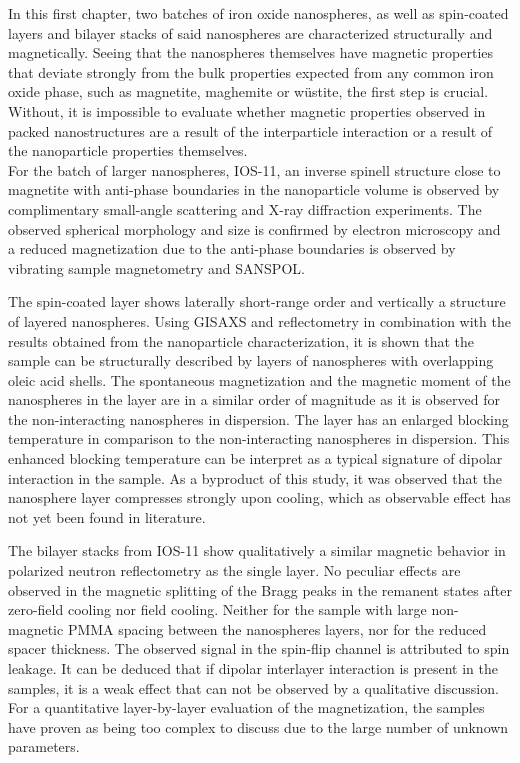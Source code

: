 \documentclass[\main/dresen_thesis.tex]{subfiles}
\begin{document}
  In this first chapter, two batches of iron oxide nanospheres, as well as spin-coated layers and bilayer stacks of said nanospheres are characterized structurally and magnetically.
  Seeing that the nanospheres themselves have magnetic properties that deviate strongly from the bulk properties expected from any common iron oxide phase, such as magnetite, maghemite or w\"ustite, the first step is crucial.
  Without, it is impossible to evaluate whether magnetic properties observed in packed nanostructures are a result of the interparticle interaction or a result of the nanoparticle properties themselves.
  \\

  For the batch of larger nanospheres, IOS-11, an inverse spinell structure close to magnetite with anti-phase boundaries in the nanoparticle volume is observed by complimentary small-angle scattering and X-ray diffraction experiments.
  The observed spherical morphology and size is confirmed by electron microscopy and a reduced magnetization due to the anti-phase boundaries is observed by vibrating sample magnetometry and SANSPOL.

  The spin-coated layer shows laterally short-range order and vertically a structure of layered nanospheres.
  Using GISAXS and reflectometry in combination with the results obtained from the nanoparticle characterization, it is shown that the sample can be structurally described by layers of nanospheres with overlapping oleic acid shells.
  The spontaneous magnetization and the magnetic moment of the nanospheres in the layer are in a similar order of magnitude as it is observed for the non-interacting nanospheres in dispersion.
  The layer has an enlarged blocking temperature in comparison to the non-interacting nanospheres in dispersion.
  This enhanced blocking temperature can be interpret as a typical signature of dipolar interaction in the sample.
  As a byproduct of this study, it was observed that the nanosphere layer compresses strongly upon cooling, which as observable effect has not yet been found in literature.

  The bilayer stacks from IOS-11 show qualitatively a similar magnetic behavior in polarized neutron reflectometry as the single layer.
  No peculiar effects are observed in the magnetic splitting of the Bragg peaks in the remanent states after zero-field cooling nor field cooling.
  Neither for the sample with large non-magnetic PMMA spacing between the nanospheres layers, nor for the reduced spacer thickness.
  The observed signal in the spin-flip channel is attributed to spin leakage.
  It can be deduced that if dipolar interlayer interaction is present in the samples, it is a weak effect that can not be observed by a qualitative discussion.
  For a quantitative layer-by-layer evaluation of the magnetization, the samples have proven as being too complex to discuss due to the large number of unknown parameters.
  \\
\end{document}
